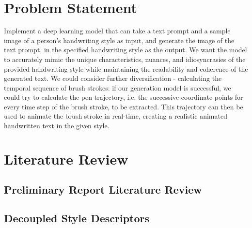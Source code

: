 \documentclass[10pt,twocolumn,letterpaper]{article}
\begin{document}
\section{Problem Statement}
\label{sec: PS}
Implement a deep learning model that can take a text prompt and a sample image of a person's handwriting style as input, and generate the image of the text prompt, in the specified handwriting style as the output. We want the model to accurately mimic the unique characteristics, nuances, and idiosyncrasies of the provided handwriting style while maintaining the readability and coherence of the generated text. We could consider further diversification - calculating the temporal sequence of brush strokes: if our generation model is successful, we could try to calculate the pen trajectory, i.e. the successive coordinate points for every time step of the brush stroke, to be extracted. This trajectory can then be used to animate the brush stroke in real-time, creating a realistic animated handwritten text in the given style.  


\section{Literature Review}
\label{sec: Lit Rev}
\subsection*{Preliminary Report Literature Review}

\subsection{Decoupled Style Descriptors\cite{BRUSH-paper}} 
\label{subsec: Brush Paper}


\end{document}
